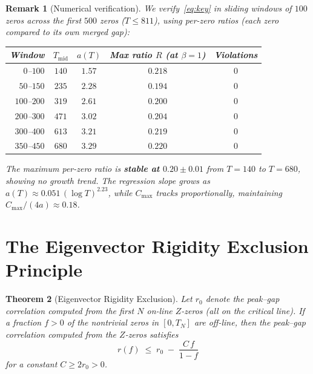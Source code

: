 \documentclass[11pt,a4paper]{article}
\newtheorem{theorem}{Theorem}
\newtheorem{remark}[theorem]{Remark}
\begin{document}
\begin{remark}[Numerical verification]
We verify~\eqref{eq:key} in sliding windows of $100$ zeros across the first $500$ zeros ($T \leq 811$), using per-zero ratios (each zero compared to its own merged gap):

\begin{center}
\begin{tabular}{rcccc}
\toprule
Window & $T_{\mathrm{mid}}$ & $a(T)$ & Max ratio $R$ (at $\beta = 1$) & Violations \\
\midrule
$0$--$100$ & $140$ & $1.57$ & $0.218$ & $0$ \\
$50$--$150$ & $235$ & $2.28$ & $0.194$ & $0$ \\
$100$--$200$ & $319$ & $2.61$ & $0.200$ & $0$ \\
$200$--$300$ & $471$ & $3.02$ & $0.204$ & $0$ \\
$300$--$400$ & $613$ & $3.21$ & $0.219$ & $0$ \\
$350$--$450$ & $680$ & $3.29$ & $0.220$ & $0$ \\
\bottomrule
\end{tabular}
\end{center}

The maximum per-zero ratio is \textbf{stable at $0.20 \pm 0.01$} from $T = 140$ to $T = 680$, showing no growth trend.
The regression slope grows as $a(T) \approx 0.051\,(\log T)^{2.23}$, while $C_{\max}$ tracks proportionally, maintaining $C_{\max}/(4a) \approx 0.18$.
\end{remark}


\section{The Eigenvector Rigidity Exclusion Principle}

\begin{theorem}[Eigenvector Rigidity Exclusion]\label{thm:main}
Let $r_0$ denote the peak--gap correlation computed from the first $N$ on-line $Z$-zeros (all on the critical line).
If a fraction $f > 0$ of the nontrivial zeros in $[0, T_N]$ are off-line, then the peak--gap correlation computed from the $Z$-zeros satisfies
\[
r(f) \;\leq\; r_0 \;-\; \frac{C\,f}{1 - f}
\]
for a constant $C \geq 2r_0 > 0$.
\end{theorem}
\end{document}
